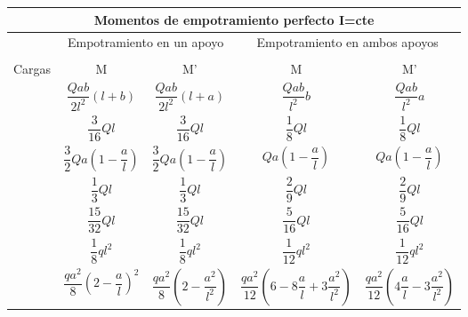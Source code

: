 \clearpage
\begin{table}[H]
    \centering
    \resizebox{0.95\textwidth}{!}
    {
    \begin{tabular}{m{4cm}cccc}
         \multicolumn{5}{c}{\Large Momentos de empotramiento perfecto I=cte} \\ \toprule
         & \multicolumn{2}{c}{\large Empotramiento en un apoyo} & \multicolumn{2}{c}{\large Empotramiento en ambos apoyos} \\ \cmidrule{2-5} 
         &   &  & \multicolumn{2}{c}{} \\ \cmidrule{1-5}
        \multicolumn{1}{c}{\large{Cargas}} & \large{M} & \large{M'} & \large{M} & \large{M'} \\ \midrule
         & \large{$\dfrac{Qab}{2l^2}(l+b)$} &  \large{$\dfrac{Qab}{2l^2}(l+a)$} & \large{$\dfrac{Qab}{l^2}b$} & \large{$\dfrac{Qab}{l^2}a$} \\ \midrule
         & \large{$\dfrac{3}{16}Ql$} & \large{$\dfrac{3}{16}Ql$} & \large{$\dfrac{1}{8}Ql$} & \large{$\dfrac{1}{8}Ql$} \\ \midrule
         & \large{$\dfrac{3}{2}Qa\left(1-\dfrac{a}{l}\right)$} & \large{$\dfrac{3}{2}Qa\left(1-\dfrac{a}{l}\right)$} & \large{$Qa\left(1-\dfrac{a}{l}\right)$} & \large{$Qa\left(1-\dfrac{a}{l}\right)$} \\ \midrule
         & \large{$\dfrac{1}{3}Ql$} & \large{$\dfrac{1}{3}Ql$} & \large{$\dfrac{2}{9}Ql$} & \large{$\dfrac{2}{9}Ql$} \\ \midrule
         & \large{$\dfrac{15}{32}Ql$} & \large{$\dfrac{15}{32}Ql$} & \large{$\dfrac{5}{16}Ql$} & \large{$\dfrac{5}{16}Ql$} \\ \midrule
         & \large{$\dfrac{1}{8}ql^2$} & \large{$\dfrac{1}{8}ql^2$} & \large{$\dfrac{1}{12}ql^2$} & \large{$\dfrac{1}{12}ql^2$} \\ \midrule
         & \large{$\dfrac{qa^2}{8}\left(2-\dfrac{a}{l}\right)^2$} & \large{$\dfrac{qa^2}{8}\left(2-\dfrac{a^2}{l^2}\right)$} & \large{$\dfrac{qa^2}{12}\left(6-8\dfrac{a}{l}+3\dfrac{a^2}{l^2}\right)$} & \large{$\dfrac{qa^2}{12}\left(4\dfrac{a}{l}-3\dfrac{a^2}{l^2}\right)$} \\ \midrule

\end{tabular}}
\end{table}
